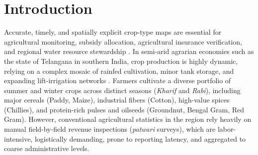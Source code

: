 \documentclass[runningheads]{llncs}
\begin{document}
\begin{abstract}
\end{abstract}

\section{Introduction}
Accurate, timely, and spatially explicit crop-type maps are essential for agricultural monitoring, subsidy allocation, agricultural insurance verification, and regional water resource stewardship \cite{defourny2019,griffiths2019}. In semi-arid agrarian economies such as the state of Telangana in southern India, crop production is highly dynamic, relying on a complex mosaic of rainfed cultivation, minor tank storage, and expanding lift-irrigation networks \cite{gumma2020}. Farmers cultivate a diverse portfolio of summer and winter crops across distinct seasons (\emph{Kharif} and \emph{Rabi}), including major cereals (Paddy, Maize), industrial fibers (Cotton), high-value spices (Chillies), and protein-rich pulses and oilseeds (Groundnut, Bengal Gram, Red Gram). However, conventional agricultural statistics in the region rely heavily on manual field-by-field revenue inspections (\emph{patwari} surveys), which are labor-intensive, logistically demanding, prone to reporting latency, and aggregated to coarse administrative levels.
\end{document}
